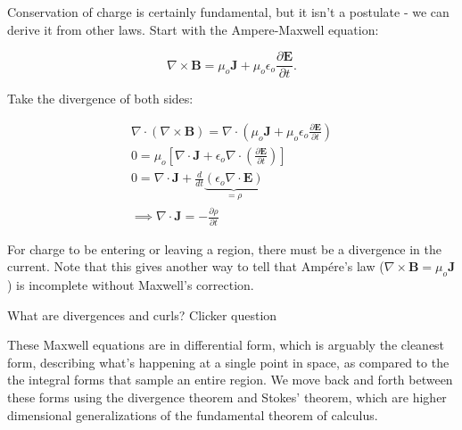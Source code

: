 \documentclass{article}
\begin{document}
Conservation of charge is certainly fundamental, but it isn't a postulate - we can derive it from other laws. Start with the Ampere-Maxwell equation:

\begin{equation*}
    \nabla \times \bm{B} = \mu_o \bm{J} + \mu_o \epsilon_o \frac{\partial \bm{E}}{\partial t}.
\end{equation*}

Take the divergence of both sides:

\begin{gather*}
    \nabla \cdot \left( \nabla \times \bm{B} \right) = \nabla \cdot \left( \mu_o \bm{J} + \mu_o \epsilon_o \frac{\partial \bm{E}}{\partial t} \right) \\
    0 = \mu_o \left[ \nabla \cdot \bm{J} + \epsilon_o \nabla \cdot \left( \frac{\partial \bm{E}}{\partial t} \right) \right] \\
    0 = \nabla \cdot \bm{J} + \frac{d}{dt} \underbrace{\left( \epsilon_o \nabla \cdot \bm{E} \right)}_{\displaystyle = \rho} \\
    \implies \boxed{\nabla \cdot \bm{J} = -\frac{\partial \rho}{\partial t}}
\end{gather*}

For charge to be entering or leaving a region, there must be a divergence in the current. Note that this gives another way to tell that Amp{\'e}re's law ($\displaystyle \nabla \times \bm{B} = \mu_o \bm{J}$) is incomplete without Maxwell's correction.

\vspace{1em}

\begin{mdframed}[backgroundcolor=black!4, align=center, userdefinedwidth=0.8\textwidth, topline=false, bottomline = false, leftline = false, rightline = false, frametitle = {Interlude}]

What are divergences and curls? \hspace{2cm} \iclicker[scale=0.28]Clicker question

\end{mdframed}

\vspace{1cm}

These Maxwell equations are in differential form, which is arguably the cleanest form, describing what's happening at a single point in space, as compared to the the integral forms that sample an entire region. We move back and forth between these forms using the divergence theorem and Stokes' theorem, which are higher dimensional generalizations of the fundamental theorem of calculus.
\end{document}
